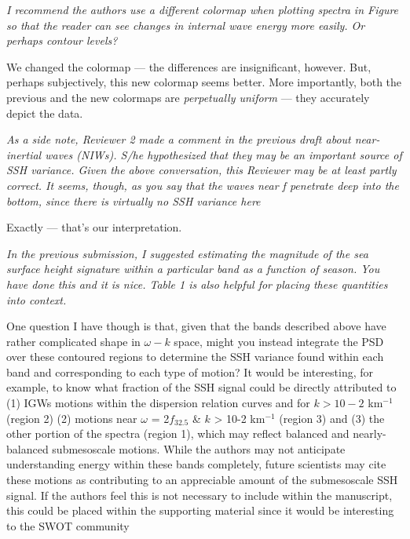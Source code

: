 \documentclass[11pt]{article}
\newcommand{\bdp}{\begin{description}}
\newcommand{\edp}{\end{description}}
\begin{document}
\begin{enumerate}
\item {\it I recommend the authors use a different colormap when plotting spectra in Figure so that the
reader can see changes in internal wave energy more easily. Or perhaps contour levels?}

\bdp
  \item \noindent We changed the colormap --- the differences are insignificant, however.
        But, perhaps subjectively, this new colormap seems better. More importantly,
        both the previous and the new colormaps are \textit{perpetually uniform}
        --- they accurately depict the data.
\edp

\item {\it As a side note, Reviewer 2 made a comment in the previous draft about near-inertial waves
(NIWs). S/he hypothesized that they may be an important source of SSH variance. Given the
above conversation, this Reviewer may be at least partly correct. It seems, though, as you say
that the waves near f penetrate deep into the bottom, since there is virtually no SSH variance
here}

\bdp
  \item \noindent Exactly --- that's our interpretation.
\edp

\item{\it In the previous submission, I suggested estimating the magnitude of the sea surface height
signature within a particular band as a function of season. You have done this and it is nice.
Table 1 is also helpful for placing these quantities into context.

One question I have though is that, given that the bands described above have rather
complicated shape in $\omega-k$ space, might you instead integrate the PSD over these contoured
regions to determine the SSH variance found within each band and corresponding to each
type of motion? It would be interesting, for example, to know what fraction of the SSH signal
could be directly attributed to (1) IGWs motions within the dispersion relation curves and for
$k > 10-2$ km$^{-1}$ (region 2) (2) motions near $\omega$ = 2$f_{32.5}$ \& $k$ > 10-2 km$^{-1}$ (region 3) and (3) the
other portion of the spectra (region 1), which may reflect balanced and nearly-balanced
submesoscale motions. While the authors may not anticipate understanding energy within
these bands completely, future scientists may cite these motions as contributing to an
appreciable amount of the submesoscale SSH signal. If the authors feel this is not necessary
to include within the manuscript, this could be placed within the supporting material since it
would be interesting to the SWOT community}


\end{enumerate}
\end{document}
